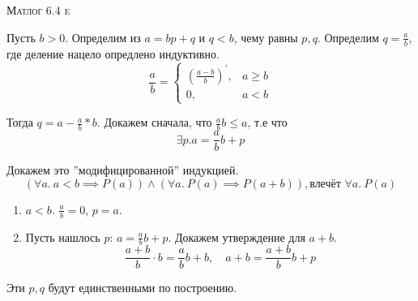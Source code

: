 \documentclass[10pt]{article}
\begin{document}
\def\chap#1#2{\ \\ {\large\bf#1 \ | \ \tt\scshape#2} \par}

\ \vspace{-1cm}

{\bf
\ \\
\Large\centerline{\scshape Матлог 6.4 e}
}\normalsize

Пусть $b >0$. Определим из $a = bp + q$ и $q < b$, чему равны $p, q$.
Определим $q = \frac{a}{b}$, где деление нацело опредлено индуктивно. 
\[ \frac{a}{b} = \begin{cases}
    (\frac{a - b}{b})^\prime, & a \geqslant b\\
    0, & a < b
\end{cases} \]

Тогда $q = a - \frac{a}{b}*b$.
Докажем сначала, что $\frac{a}{b} b \leqslant a$, т.е что 
\[ \exists p. a = \frac{a}{b}b + p\]

Докажем это ''модифицированной'' индукцией.
\[ (\forall a.\ a < b \implies P(a)) \land (\forall a.\ P(a)\implies P(a+b)), \text{влечёт } \forall a.\ P(a) \]

\begin{enumerate}
    \item $a < b$. $\frac{a}{b} = 0$, $p = a$.
    \item Пусть нашлось $p$: $a = \frac{a}{b}b + p$.
    Докажем утверждение для $a+b$. 
    \[\frac{a+b}{b}\cdot b = \frac{a}{b}b + b, \quad a+b = \frac{a+b}{b}b + p\]
\end{enumerate}

Эти $p,q$ будут единственными по построению.
\end{document}
